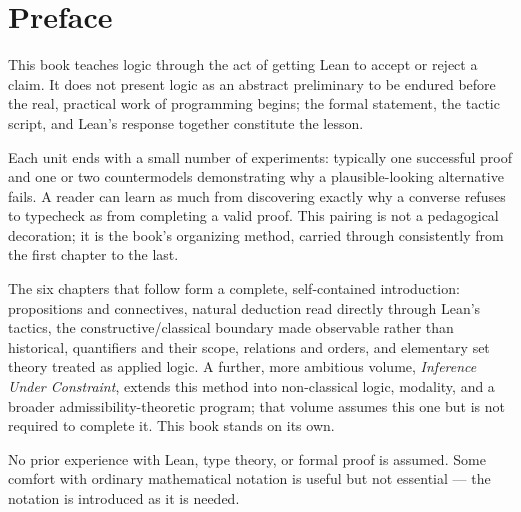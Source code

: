 \chapter*{Preface}

This book teaches logic through the act of getting Lean to accept or
reject a claim. It does not present logic as an abstract preliminary
to be endured before the real, practical work of programming begins;
the formal statement, the tactic script, and Lean's response
together constitute the lesson.

Each unit ends with a small number of experiments: typically one
successful proof and one or two countermodels demonstrating why a
plausible-looking alternative fails. A reader can learn as much from
discovering exactly why a converse refuses to typecheck as from
completing a valid proof. This pairing is not a pedagogical
decoration; it is the book's organizing method, carried through
consistently from the first chapter to the last.

The six chapters that follow form a complete, self-contained
introduction: propositions and connectives, natural deduction read
directly through Lean's tactics, the constructive/classical boundary
made observable rather than historical, quantifiers and their scope,
relations and orders, and elementary set theory treated as applied
logic. A further, more ambitious volume, \textit{Inference Under
Constraint}, extends this method into non-classical logic, modality,
and a broader admissibility-theoretic program; that volume assumes
this one but is not required to complete it. This book stands on its
own.

No prior experience with Lean, type theory, or formal proof is
assumed. Some comfort with ordinary mathematical notation is useful
but not essential — the notation is introduced as it is needed.
